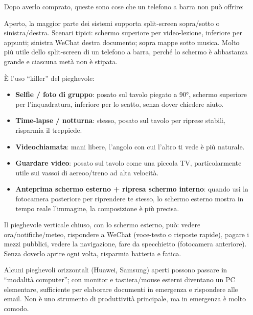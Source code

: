 
Dopo averlo comprato, queste sono cose che un telefono a barra non può offrire:


Aperto, la maggior parte dei sistemi supporta split-screen sopra/sotto o sinistra/destra. Scenari tipici: schermo superiore per video-lezione, inferiore per appunti; sinistra WeChat destra documento; sopra mappe sotto musica. Molto più utile dello split-screen di un telefono a barra, perché lo schermo è abbastanza grande e ciascuna metà non è stipata.


È l'uso “killer” del pieghevole:

\begin{itemize}
  \item \textbf{Selfie / foto di gruppo}: posato sul tavolo piegato a 90°, schermo superiore per l'inquadratura, inferiore per lo scatto, senza dover chiedere aiuto.
  \item \textbf{Time-lapse / notturna}: stesso, posato sul tavolo per riprese stabili, risparmia il treppiede.
  \item \textbf{Videochiamata}: mani libere, l'angolo con cui l'altro ti vede è più naturale.
  \item \textbf{Guardare video}: posato sul tavolo come una piccola TV, particolarmente utile sui vassoi di aereoo/treno ad alta velocità.
  \item \textbf{Anteprima schermo esterno + ripresa schermo interno}: quando usi la fotocamera posteriore per riprendere te stesso, lo schermo esterno mostra in tempo reale l'immagine, la composizione è più precisa.
\end{itemize}


Il pieghevole verticale chiuso, con lo schermo esterno, può: vedere ora/notifiche/meteo, rispondere a WeChat (voce-testo o risposte rapide), pagare i mezzi pubblici, vedere la navigazione, fare da specchietto (fotocamera anteriore). Senza doverlo aprire ogni volta, risparmia batteria e fatica.


Alcuni pieghevoli orizzontali (Huawei, Samsung) aperti possono passare in “modalità computer”; con monitor e tastiera/mouse esterni diventano un PC elementare, sufficiente per elaborare documenti in emergenza e rispondere alle email. Non è uno strumento di produttività principale, ma in emergenza è molto comodo.

